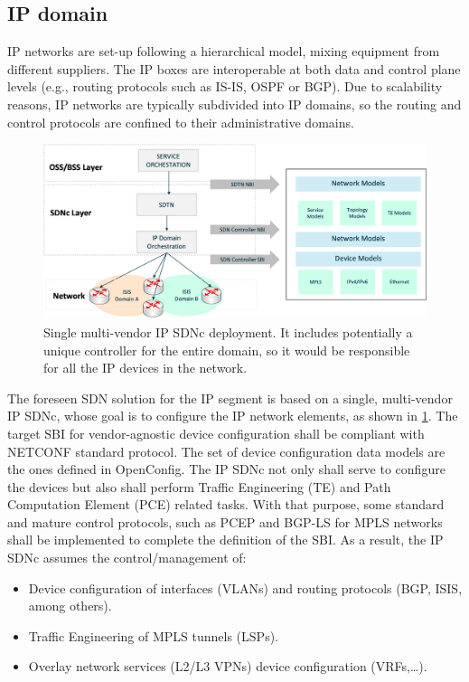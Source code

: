 \documentclass[a4paper,fleqn]{cas-dc}
\begin{document}
\subsection {IP domain}
\label{section:ip}
IP networks are set-up following a hierarchical model, mixing equipment from different suppliers. The IP boxes are interoperable at both data and control plane levels (e.g., routing protocols such as IS-IS, OSPF or BGP). Due to scalability reasons, IP networks are typically subdivided into IP domains, so the routing and control protocols are confined to their administrative domains.

\begin{figure}
	\centering
		\includegraphics[scale=0.5]{figs/ifusion_multidomain_2.png}
	\caption{Single multi-vendor IP SDNc deployment. It includes potentially a unique controller for the entire domain, so it would be responsible for all the IP devices in the network.}
	\label{FIG:2}
\end{figure}

The foreseen SDN solution for the IP segment is based on a single, multi-vendor IP SDNc, whose goal is to configure the IP network elements, as shown in \cref{FIG:2}. The target SBI for vendor-agnostic device configuration shall be compliant with NETCONF standard protocol. The set of device configuration data models are the ones defined in OpenConfig. 
The IP SDNc not only shall serve to configure the devices but also shall perform Traffic Engineering (TE) and Path Computation Element (PCE) related tasks. With that purpose, some standard and mature control protocols, such as PCEP and BGP-LS for MPLS networks shall be implemented to complete the definition of the SBI. As a result, the IP SDNc assumes the control/management of:
\begin{itemize}
\item Device configuration of interfaces (VLANs) and routing protocols (BGP, ISIS, among others).
\item Traffic Engineering of MPLS tunnels (LSPs). 
\item Overlay network services (L2/L3 VPNs) device configuration (VRFs,\dots).
\end{itemize}
\end{document}
